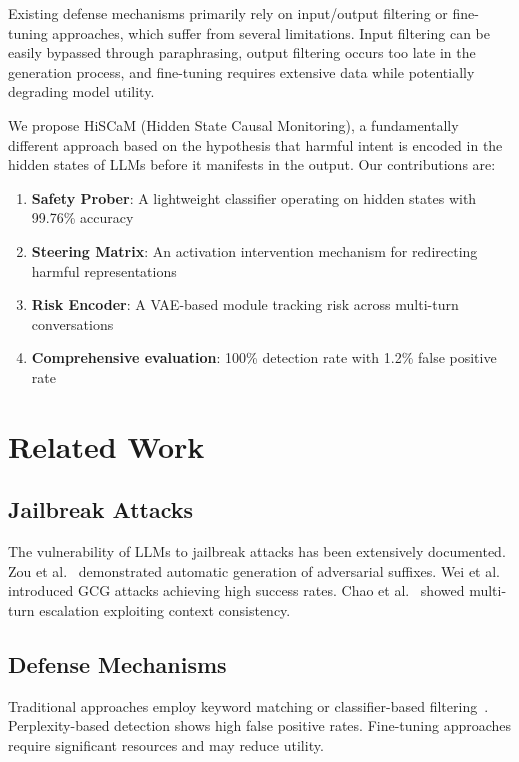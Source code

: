 \documentclass[10pt,twocolumn]{article}
\newcommand{\method}{HiSCaM}  %
\begin{document}
Existing defense mechanisms primarily rely on input/output filtering or fine-tuning approaches, which suffer from several limitations. Input filtering can be easily bypassed through paraphrasing, output filtering occurs too late in the generation process, and fine-tuning requires extensive data while potentially degrading model utility.

We propose \method{} (Hidden State Causal Monitoring), a fundamentally different approach based on the hypothesis that harmful intent is encoded in the hidden states of LLMs before it manifests in the output. Our contributions are:

\begin{enumerate}
\item \textbf{Safety Prober}: A lightweight classifier operating on hidden states with 99.76\% accuracy
\item \textbf{Steering Matrix}: An activation intervention mechanism for redirecting harmful representations
\item \textbf{Risk Encoder}: A VAE-based module tracking risk across multi-turn conversations
\item \textbf{Comprehensive evaluation}: 100\% detection rate with 1.2\% false positive rate
\end{enumerate}

\section{Related Work}

\subsection{Jailbreak Attacks}

The vulnerability of LLMs to jailbreak attacks has been extensively documented. Zou et al.~\cite{zou2023universal} demonstrated automatic generation of adversarial suffixes. Wei et al.~\cite{wei2023jailbroken} introduced GCG attacks achieving high success rates. Chao et al.~\cite{chao2023jailbreaking} showed multi-turn escalation exploiting context consistency.

\subsection{Defense Mechanisms}

Traditional approaches employ keyword matching or classifier-based filtering~\cite{alon2023detecting}. Perplexity-based detection shows high false positive rates. Fine-tuning approaches require significant resources and may reduce utility.
\end{document}
